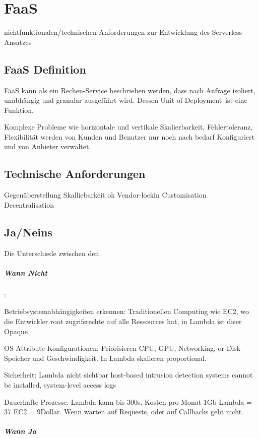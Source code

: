 \documentclass[
12pt,
english,
ngerman,
headsepline,
twoside,
openright,
numbers=noenddot,version=first
]{scrreprt}
\begin{document}
\chapter{FaaS}{nichtfunktionalen/technischen Anforderungen zur Entwicklung des Serverless-Ansatzes}

\section{FaaS Definition}
\label{sec:faas}
\acrshort{FaaS} kann als ein Rechen-Service beschrieben werden, dass nach Anfrage isoliert, unabhängig und granular ausgeführt wird. Dessen \glqq Unit of Deployment\grqq\ ist eine Funktion. 

Komplexe Probleme wie horizontale und vertikale Skalierbarkeit, Fehlertoleranz, Flexibilität werden von Kunden und Benutzer nur noch nach bedarf Konfiguriert und von Anbieter verwaltet.

\section{Technische Anforderungen}
Gegenüberstellung 
Skalliebarkeit ok
Vendor-lockin
Customisation
Decentralisation
\section{Ja/Neins}

Die Unterschiede zwischen den\cite{lambdaAWS}
\paragraph{Wann Nicht}: 

Betriebsystemabhängigkeiten erkennen: Traditionellen Computing wie EC2, wo die Entwickler root 
zugrifsrechte auf alle Ressources hat, in Lambda ist diser Opaque.

OS Attribute Konfigurationen: Priorisieren CPU, GPU, Networking, or Disk Speicher und Geschwindigkeit. In Lambda skalieren proportional.

Sicherheit: Lambda nicht sichtbar host-based intrusion detection systems cannot be installed, system-level access logs

Dauerhafte Prozesse. Lambda kann bis 300s. Kosten pro Monat 1Gb  Lambda = 37 EC2 = 9Dollar. Wenn warten auf Requests, oder auf Callbacks geht nicht.

\paragraph{Wann Ja}
\end{document}
